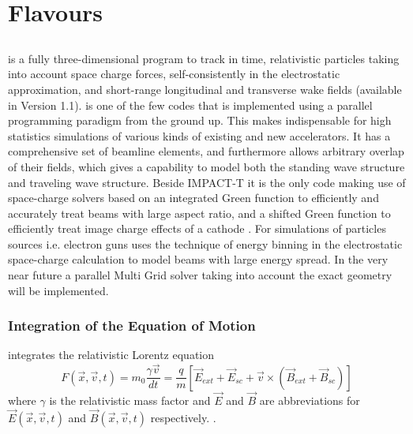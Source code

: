 \chapter{\opal Flavours}
\label{sec:opalFlavours}

\section{\opalt}
\opalt is a fully three-dimensional program to track in time, relativistic particles taking into account space charge forces, self-consistently in the electrostatic approximation, and short-range longitudinal and transverse wake fields (available in Version 1.1). \opalt  is one of the few
codes  that is implemented using a parallel programming paradigm from the ground up. This makes \opalt indispensable for
high statistics simulations of various kinds of existing and new accelerators. It has a comprehensive set of beamline
elements, and furthermore allows arbitrary overlap of their fields, which gives \opalt a capability
to model both the standing wave structure and traveling wave structure. Beside IMPACT-T it is the only code making use of
space-charge solvers based on an integrated Green \cite{qiang2005} function to efficiently and accurately treat beams with
large aspect ratio, and a shifted Green function to efficiently treat image charge effects of a cathode \cite{fubiani2006,qiang2006-2}. 
For simulations of particles sources i.e. electron guns \opalt uses the technique of  energy binning in the electrostatic space-charge calculation to model beams with large
energy spread. In the very near future a parallel Multi Grid solver taking into account the exact geometry will be implemented.  

\subsection{Integration of the Equation of Motion}
\opalt integrates the relativistic Lorentz equation
\begin{equation}
F(\vec{x},\vec{v},t) = m_0 \frac{\gamma \vec{v}}{dt} =   \frac{q}{m}[\vec{E}_{ext} + \vec{E}_{sc} + \vec{v} \times (\vec{B}_{ext} + \vec{B}_{sc})]
\end{equation}
where $\gamma$ is the relativistic mass factor and $\vec{E}$  and $\vec{B}$ are abbreviations for $\vec{E}(\vec{x},\vec{v},t)$ and $\vec{B}(\vec{x},\vec{v},t)$
respectively. \latermore .


